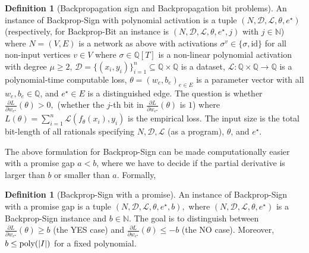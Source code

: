 \documentclass{article}
\newcommand{\Q}{\mathbb{Q}}
\newcommand{\cL}{\mathcal{L}}
\newcommand{\poly}{\textnormal{poly}}
\newcommand{\cD}{\mathcal{D}}
\theoremstyle{plain}
\theoremstyle{definition}
\newtheorem{definition}[theorem]{Definition}
\theoremstyle{remark}
\begin{document}
\begin{definition}[Backpropagation sign  and Backpropagation bit problems]
	\label{def:backprop-sign}
	An instance of \textnormal{Backprop-Sign} with polynomial activation is a tuple
	$
	(N,\cD,\cL,\theta,e^\star)
	$
    (respectively, for \textnormal{Backprop-Bit} an instance is $(N,\cD,\cL,\theta,e^\star,j)$ with $j \in \mathbb{N}$)
	where $N=(V,E)$ is a network as above with activations
	$\sigma^v\in\{\sigma,\mathrm{id}\}$ for all non-input vertices
	$v\in V$ where $\sigma \in \Q[T]$ is a non-linear polynomial activation with degree $ \mu \geq 2$, $\cD=\{(x_i,y_i)\}_{i=1}^n\subseteq\mathbb{Q}\times\mathbb{Q}$
	is a dataset, $\cL:\mathbb{Q}\times\mathbb{Q}\to\mathbb{Q}$ is a
	polynomial-time computable loss, $\theta=(w_e,b_e)_{e\in E}$ is a
	parameter vector with all $w_e,b_e\in\mathbb{Q}$, and
	$e^\star\in E$ is a distinguished edge.  The question is whether
	$
	\frac{\partial L}{\partial w_{e^\star}}(\theta) > 0,
	$
    (whether the $j$-th bit in $\frac{\partial L}{\partial w_{e^\star}}(\theta)$ is $1$)
	where $L(\theta)=\sum_{i=1}^n \cL(f_\theta(x_i),y_i)$ is the empirical
	loss.  The input size is the total bit-length of all rationals
	specifying $N,\cD,\cL$ (as a program), $\theta$, and $e^\star$.
\end{definition}

The above formulation for \textnormal{Backprop-Sign} can be made computationally easier with a promise gap $a < b$, where we have to decide if the partial derivative is larger than $b$ or smaller than $a$. Formally, 

\begin{definition}[\textnormal{Backprop-Sign} with a promise]
	\label{def:backprop-sign-promise}
	An instance of \textnormal{Backprop-Sign} with a promise gap is a tuple 
	$
	(N,\cD,\cL,\theta,e^\star,b),
	$
	where $(N,\cD,\cL,\theta,e^\star)$ is a \textnormal{Backprop-Sign} instance and $b \in \mathbb{N}$. The goal is to distinguish between $\frac{\partial L}{\partial w_{e^\star}}(\theta) \geq b$ (the YES case) and $\frac{\partial L}{\partial w_{e^\star}}(\theta) \leq -b$ (the NO case). Moreover, $b \leq \poly(|I|)$ for a fixed polynomial.
\end{definition}












\end{document}
